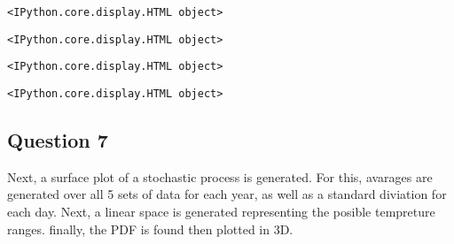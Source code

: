 \documentclass[11pt]{article}
\begin{document}
    
    
    \begin{verbatim}
<IPython.core.display.HTML object>
    \end{verbatim}

    
    
    \begin{verbatim}
<IPython.core.display.HTML object>
    \end{verbatim}

    
    
    \begin{verbatim}
<IPython.core.display.HTML object>
    \end{verbatim}

    
    
    \begin{verbatim}
<IPython.core.display.HTML object>
    \end{verbatim}

    
    \subsection{Question 7}\label{question-7}

Next, a surface plot of a stochastic process is generated. For this,
avarages are generated over all 5 sets of data for each year, as well as
a standard diviation for each day. Next, a linear space is generated
representing the posible tempreture ranges. finally, the PDF is found
then plotted in 3D.
\end{document}
